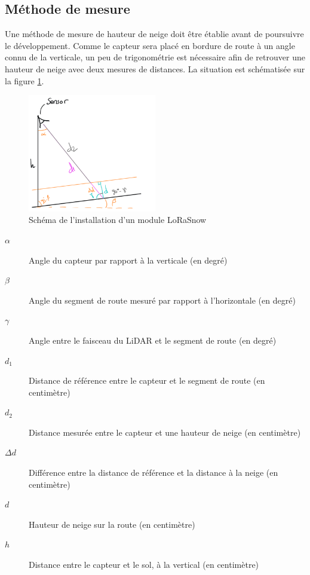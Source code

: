 \subsection{Méthode de mesure}
\label{MethodeDeMesure}

Une méthode de mesure de hauteur de neige doit être établie avant de poursuivre le développement. Comme
le capteur sera placé en bordure de route à un angle connu de la verticale, un peu de trigonométrie est
nécessaire afin de retrouver une hauteur de neige avec deux mesures de distances. La situation est
schématisée sur la figure \ref{LiDARMesMethod}.

\begin{figure}[H]
    \centering
    \includegraphics[width=0.5\textwidth]{Images/LiDAR/LiDAR_MesMethod.png}
    \caption{Schéma de l'installation d'un module LoRaSnow}
    \label{LiDARMesMethod}
\end{figure}

\begin{description}
    \item[$\alpha$] Angle du capteur par rapport à la verticale (en degré)
    \item[$\beta$] Angle du segment de route mesuré par rapport à l'horizontale (en degré)
    \item[$\gamma$] Angle entre le faisceau du LiDAR et le segment de route (en degré) 
    \item[$d_1$] Distance de référence entre le capteur et le segment de route (en centimètre)
    \item[$d_2$] Distance mesurée entre le capteur et une hauteur de neige (en centimètre)
    \item[$\Delta d$] Différence entre la distance de référence et la distance à la neige (en centimètre) 
    \item[$d$] Hauteur de neige sur la route (en centimètre) 
    \item[$h$] Distance entre le capteur et le sol, à la vertical (en centimètre)
\end{description}

